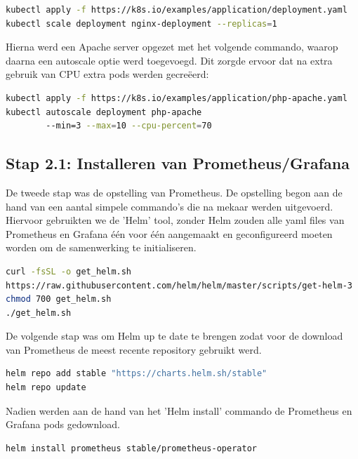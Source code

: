 \begin{lstlisting}[language=bash,caption={nginx installatie}]
kubectl apply -f https://k8s.io/examples/application/deployment.yaml 
kubectl scale deployment nginx-deployment --replicas=1   
\end{lstlisting}

\clearpage
Hierna werd een Apache server opgezet met het volgende commando, waarop daarna een autoscale optie werd toegevoegd. Dit zorgde ervoor dat na extra gebruik van CPU extra pods werden gecreëerd:

\begin{lstlisting}[language=bash,caption={apache installatie}]
kubectl apply -f https://k8s.io/examples/application/php-apache.yaml
kubectl autoscale deployment php-apache 
        --min=3 --max=10 --cpu-percent=70
\end{lstlisting}


\subsection{Stap 2.1: Installeren van Prometheus/Grafana}

De tweede stap was de opstelling van Prometheus. De opstelling begon aan de hand van een aantal simpele commando's die na mekaar werden uitgevoerd. Hiervoor gebruikten we de 'Helm' tool, zonder Helm zouden alle yaml files van Prometheus en Grafana één voor één aangemaakt en geconfigureerd moeten worden om de samenwerking te initialiseren. 

\begin{lstlisting}[language=bash,caption={helm installatie}]
curl -fsSL -o get_helm.sh
https://raw.githubusercontent.com/helm/helm/master/scripts/get-helm-3
chmod 700 get_helm.sh
./get_helm.sh
\end{lstlisting}

De volgende stap was om Helm up te date te brengen zodat voor de download van Prometheus de meest recente repository gebruikt werd.


\begin{lstlisting}[language=bash,caption={helm repository update}]
helm repo add stable "https://charts.helm.sh/stable"
helm repo update
\end{lstlisting}

Nadien werden aan de hand van het 'Helm install' commando de Prometheus en Grafana pods gedownload.

\begin{lstlisting}[language=bash,caption={helm prometheus installatie}]
helm install prometheus stable/prometheus-operator
\end{lstlisting}

